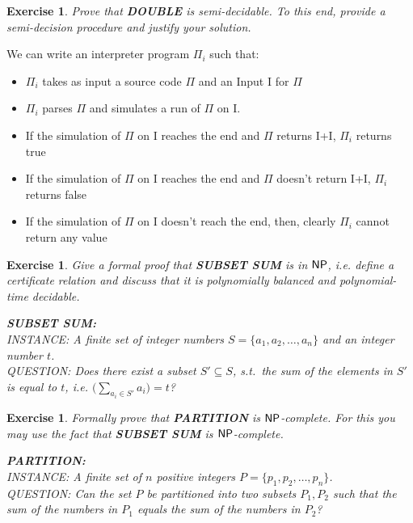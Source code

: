 \documentclass [11pt]{article}
\newtheorem{exercise}[theorem]{Exercise}
\newcommand{\ccfont}[1]{\protect\mathsf{#1}}
\newcommand{\NP}{\ccfont{NP}}
\newcommand{\solution}[1]{\noindent {\bf Solution.}  #1}
\begin{document}
\begin{exercise}
 Prove that \textbf{DOUBLE} is semi-decidable. To this end, provide a semi-decision procedure and justify your solution.
\end{exercise}


\solution{
We can write an interpreter program $\Pi_i$ such that:\\
\begin{itemize}
  \item{$\Pi_i$ takes as input a source code $\Pi$ and an Input I for $\Pi$}
  \item{$\Pi_i$ parses $\Pi$ and simulates a run of $\Pi$ on I.}
  \item{If the simulation of $\Pi$ on I reaches the end and $\Pi$ returns I+I, $\Pi_i$ returns true}
  \item{If the simulation of $\Pi$ on I reaches the end and $\Pi$ doesn't return I+I, $\Pi_i$ returns false}
  \item{If the simulation of $\Pi$ on I doesn't reach the end, then, clearly $\Pi_i$ cannot return any value }
\end{itemize}
}


\begin{exercise}
  Give a formal proof that \textbf{SUBSET SUM} is in $\NP$, i.e. define a
  certificate relation and discuss that it is polynomially balanced and
  polynomial-time decidable.
  
\medskip

\noindent \textbf{SUBSET SUM:} \\
INSTANCE: A finite set of integer numbers $S=\{a_1, a_2, \ldots, a_n\}$ and an integer number $t$. \\
QUESTION: Does there exist a subset $S'\subseteq S$, s.t.\ the sum of the elements in $S'$  is equal to $t$, i.e. $\big(\sum_{a_i \in S'} a_i\big) = t$?
  
\end{exercise}




\begin{exercise}
  \label{ex:partition}
  Formally prove that \textbf{PARTITION} is $\NP$-complete. For this you may use
  the fact that \textbf{SUBSET SUM} is $\NP$-complete.   

\medskip     
   
\noindent \textbf{PARTITION:} \\
INSTANCE: A finite set of $n$ positive integers $P=\{p_1, p_2, \ldots, p_n\}$. \\
QUESTION: Can the set $P$ be partitioned into two subsets $P_1, P_2$ such that the sum of the numbers in $P_1$ equals the sum of the numbers in $P_2$? 
  

\end{exercise}
\end{document}
